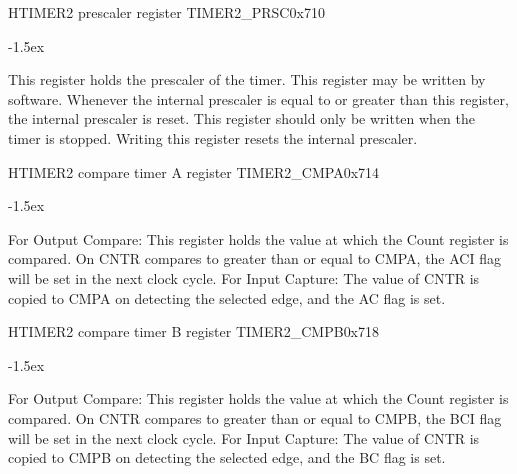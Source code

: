 \documentclass[12pt]{article}
\begin{document}
\begin{register}{H}{TIMER2 prescaler register TIMER2\_PRSC}{0x710}
\label{timer2prsc}
%
\regnewline%
\end{register}
\begin{regdesc}[0.8\textwidth]\begin{reglist}[00000]
\itemsep-1.5ex
\item[PRSC] This register holds the prescaler of the timer. This register may be written by software. Whenever the internal prescaler is equal to or greater than this register, the internal prescaler is reset. This register should only be written when the timer is stopped. Writing this register resets the internal prescaler.
\end{reglist}\end{regdesc}

\begin{register}{H}{TIMER2 compare timer A register TIMER2\_CMPA}{0x714}
\label{timer2cmpa}
%
\regnewline%
\end{register}
\begin{regdesc}[0.8\textwidth]\begin{reglist}[00000]
\itemsep-1.5ex
\item[CMPA] For Output Compare: This register holds the value at which the Count register is compared. On CNTR compares to greater than or equal to CMPA, the ACI flag will be set in the next clock cycle. For Input Capture: The value of CNTR is copied to CMPA on detecting the selected edge, and the AC flag is set.
\end{reglist}\end{regdesc}

\begin{register}{H}{TIMER2 compare timer B register TIMER2\_CMPB}{0x718}
\label{timer2cmpb}
%
\regnewline%
\end{register}
\begin{regdesc}[0.8\textwidth]\begin{reglist}[00000]
\itemsep-1.5ex
\item[CMPB] For Output Compare: This register holds the value at which the Count register is compared. On CNTR compares to greater than or equal to CMPB, the BCI flag will be set in the next clock cycle. For Input Capture: The value of CNTR is copied to CMPB on detecting the selected edge, and the BC flag is set.
\end{reglist}\end{regdesc}
\end{document}
